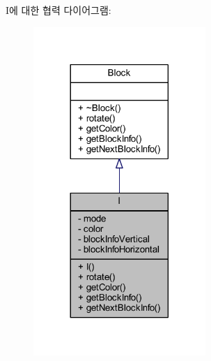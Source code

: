 I에 대한 협력 다이어그램\+:
\nopagebreak
\begin{figure}[H]
\begin{center}
\leavevmode
\includegraphics[width=185pt]{class_i__coll__graph}
\end{center}
\end{figure}
